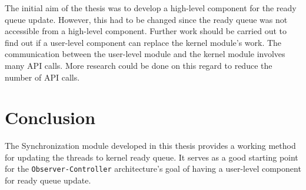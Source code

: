The initial aim of the thesis was to develop a high-level component for the ready queue update. However, this had to be changed since the ready queue was not accessible from a high-level component. Further work should be carried out to find out if a user-level component can replace the kernel module's work. The communication between the user-level module and the kernel module involves many API calls. More research could be done on this regard to reduce the number of API calls.

\section{Conclusion}\label{con}
The Synchronization module developed in this thesis provides a working method for updating the threads to kernel ready queue. It serves as a good starting point for the \texttt{Observer-Controller} architecture's goal of having a user-level component for ready queue update.